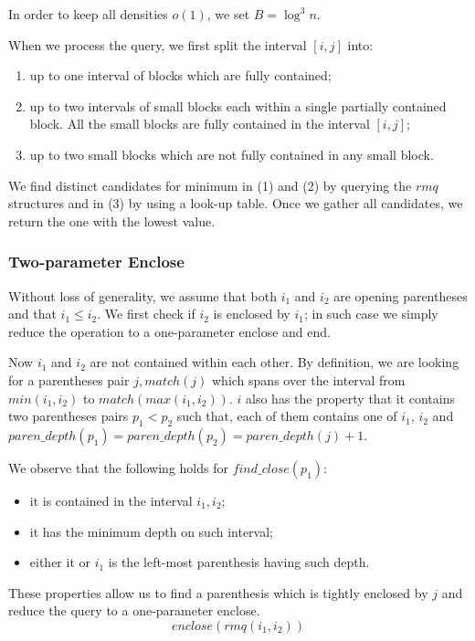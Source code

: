 In order to keep all densities $o(1)$, we set $B = \log^3 n$.

When we process the query, we first split the interval $[i, j]$ into:
\begin{enumerate}
	\item up to one interval of blocks which are fully contained;
	\item up to two intervals of small blocks each within a single partially contained block.
	All the small blocks are fully contained in the interval $[i,j]$;
	\item up to two small blocks which are not fully contained in any small block.
\end{enumerate}

We find distinct candidates for minimum in (1) and (2) by querying the $rmq$ structures and in (3) by using a look-up table.
Once we gather all candidates, we return the one with the lowest value.

\subsubsection{Two-parameter Enclose}

Without loss of generality, we assume that both $i_1$ and $i_2$ are opening parentheses and that $i_1 \le i_2$.
We first check if $i_2$ is enclosed by $i_1$; in such case we simply reduce the operation to a one-parameter enclose and end.

Now $i_1$ and $i_2$ are not contained within each other.
By definition, we are looking for a parentheses pair $j, match(j)$ which spans over the interval from $min(i_1, i_2)$ to $match(max(i_1, i_2))$.
$i$ also has the property that it contains two parentheses pairs $p_1 < p_2$ such that, each of them contains one of $i_1$, $i_2$ and $paren\_depth(p_1) = paren\_depth(p_2) = paren\_depth(j) + 1$.

We observe that the following holds for $find\_close(p_1)$:
\begin{itemize}
	\item it is contained in the interval $i_1, i_2$;
	\item it has the minimum depth on such interval;
	\item either it or $i_1$ is the left-most parenthesis having such depth.
\end{itemize}
These properties allow us to find a parenthesis which is tightly enclosed by $j$ and reduce the query to a one-parameter enclose.
$$ enclose(rmq(i_1, i_2)) $$